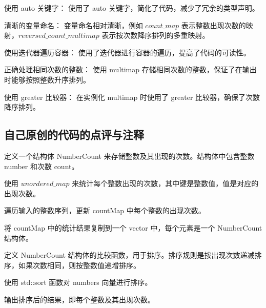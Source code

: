 使用 auto 关键字： 使用了 auto 关键字，简化了代码，减少了冗余的类型声明。

清晰的变量命名： 变量命名相对清晰，例如 $count\_map$ 表示整数出现次数的映射，$reversed\_count\_multimap$ 表示按次数降序排列的多重映射。

使用迭代器遍历容器： 使用了迭代器进行容器的遍历，提高了代码的可读性。

正确处理相同次数的整数： 使用 multimap 存储相同次数的整数，保证了在输出时能够按照整数升序排列。

使用 greater 比较器： 在实例化 multimap 时使用了 greater 比较器，确保了次数降序排列。

\subsection{自己原创的代码的点评与注释}

定义一个结构体 NumberCount 来存储整数及其出现的次数。结构体中包含整数 number 和次数 count。

使用 $unordered\_map$ 来统计每个整数出现的次数，其中键是整数值，值是对应的出现次数。

遍历输入的整数序列，更新 countMap 中每个整数的出现次数。

将 countMap 中的统计结果复制到一个 vector 中，每个元素是一个 NumberCount 结构体。

定义 NumberCount 结构体的比较函数，用于排序。排序规则是按出现次数递减排序，如果次数相同，则按整数值递增排序。

使用 std::sort 函数对 numbers 向量进行排序。

输出排序后的结果，即每个整数及其出现次数。


